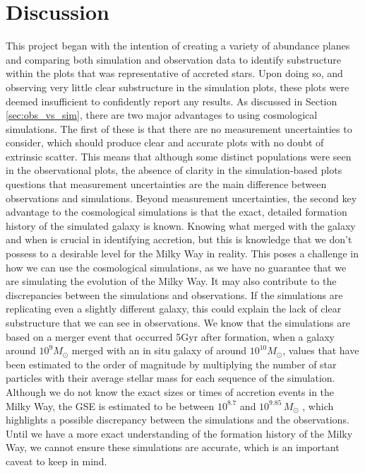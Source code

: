 \documentclass[fleqn,usenatbib]{mnras}
\begin{document}
\section{Discussion}
\label{sec:discussion}
This project began with the intention of creating a variety of abundance planes and comparing both simulation and observation data to identify substructure within the plots that was representative of accreted stars. Upon doing so, and observing very little clear substructure in the simulation plots, these plots were deemed insufficient to confidently report any results. As discussed in Section \ref{sec:obs_vs_sim}, there are two major advantages to using cosmological simulations. The first of these is that there are no measurement uncertainties to consider, which should produce clear and accurate plots with no doubt of extrinsic scatter. This means that although some distinct populations were seen in the observational plots, the absence of clarity in the simulation-based plots questions that measurement uncertainties are the main difference between observations and simulations.   
Beyond measurement uncertainties, the second key advantage to the cosmological simulations is that the exact, detailed formation history of the simulated galaxy is known. Knowing what merged with the galaxy and when is crucial in identifying accretion, but this is knowledge that we don't possess to a desirable level for the Milky Way in reality. This poses a challenge in how we can use the cosmological simulations, as we have no guarantee that we are simulating the evolution of the Milky Way. It may also contribute to the discrepancies between the simulations and observations. If the simulations are replicating even a slightly different galaxy, this could explain the lack of clear substructure that we can see in observations. We know that the simulations are based on a merger event that occurred 5Gyr after formation, when a galaxy around $10^9 M_{\odot}$ merged with an in situ galaxy of around $10^{10} M_{\odot}$, values that have been estimated to the order of magnitude by multiplying the number of star particles with their average stellar mass for each sequence of the simulation. Although we do not know the exact sizes or times of accretion events in the Milky Way, the GSE is estimated to be between $10^{8.7}$ and $10^{9.85}\,M_{\odot}$ \citep{Helmi2018,Naidu2020}, which highlights a possible discrepancy between the simulations and the observations. Until we have a more exact understanding of the formation history of the Milky Way, we cannot ensure these simulations are accurate, which is an important caveat to keep in mind.   
\end{document}
